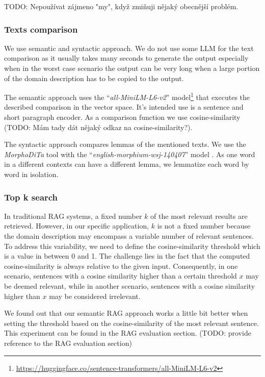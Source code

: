 TODO: Nepoužívat zájmeno "my", když zmiňuji nějaký obecnější problém. \\


\subsubsection{Texts comparison}

We use semantic and syntactic approach. We do not use some LLM for the text comparison as it usually takes many seconds to generate the output especially when in the worst case scenario the output can be very long when a large portion of the domain description has to be copied to the output.

The semantic approach uses the ``\textit{all-MiniLM-L6-v2}'' model\footnote{\url{https://huggingface.co/sentence-transformers/all-MiniLM-L6-v2}} that executes the described comparison in the vector space. It's intended use is a sentence and short paragraph encoder. As a comparison function we use cosine-similarity (TODO: Mám tady dát nějaký odkaz na cosine-similarity?).

The syntactic approach compares lemmas of the mentioned texts. We use the \textit{MorphoDiTa} tool \cite{Strakova2014} with the ``\textit{english-morphium-wsj-140407}'' model \cite{Straka2014}. As one word in a different contexts can have a different lemma, we lemmatize each word by word in isolation.


\subsubsection{Top k search}

In traditional RAG systems, a fixed number $k$ of the most relevant results are retrieved. However, in our specific application, $k$ is not a fixed number because the domain description may encompass a variable number of relevant sentences. To address this variability, we need to define the cosine-similarity threshold which is a value in between 0 and 1. The challenge lies in the fact that the computed cosine-similarity is always relative to the given input. Consequently, in one scenario, sentences with a cosine similarity higher than a certain threshold $x$ may be deemed relevant, while in another scenario, sentences with a cosine similarity higher than $x$ may be considered irrelevant.

We found out that our semantic RAG approach works a little bit better when setting the threshold based on the cosine-similarity of the most relevant sentence. This experiment can be found in the RAG evaluation section. (TODO: provide reference to the RAG evaluation section) \\

